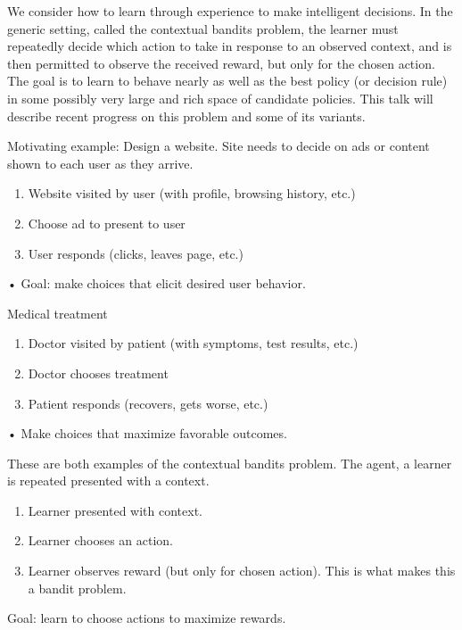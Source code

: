 \def\filepath{C:/Users/oldhe/Dropbox/Math/templates}






\pagestyle{fancy}
\chead{} 
\rhead{} 
\lfoot{} 
\cfoot{\thepage} 
\rfoot{} 
\renewcommand{\headrulewidth}{.3pt} 
\setlength\voffset{0in}
\setlength\textheight{648pt}





We consider how to learn through experience to make intelligent decisions.  In the generic setting, called the contextual bandits problem, the learner must repeatedly decide which action to take in response to an observed context, and is then permitted to observe the received reward, but only for the chosen action.  The goal is to learn to behave nearly as well as the best policy (or decision rule) in some possibly very large and rich space of candidate policies.  This talk will describe recent progress on this problem and some of its variants.

%


Motivating example: Design a website. Site needs to decide on ads or content shown to each user as they arrive.
\begin{enumerate}
\item
Website visited by user (with profile, browsing history, etc.)
\item
Choose ad to present to user
\item
User responds (clicks, leaves page, etc.)
\end{enumerate}•
Goal: make choices that elicit desired user behavior.

Medical treatment
\begin{enumerate}
\item
Doctor visited by patient (with symptoms, test results, etc.)
\item
Doctor chooses treatment
\item
Patient responds (recovers, gets worse, etc.)
\end{enumerate}•
Make choices that maximize favorable outcomes.


These are both examples of the contextual bandits problem. The agent, a learner is repeated presented with a context.
\begin{enumerate}
\item
Learner presented with context.
\item
Learner chooses an action.
\item
Learner observes reward (but only for chosen action). This is what makes this a bandit problem. 
\end{enumerate}
Goal: learn to choose actions to maximize rewards.

